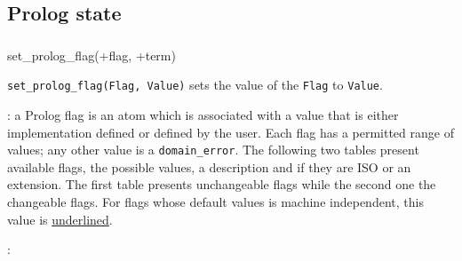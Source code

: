 \subsection{Prolog state}

\subsubsection{\label{set-prolog-flag/2}}

\begin{TemplatesOneCol}
set\_prolog\_flag(+flag, +term)

\end{TemplatesOneCol}

\Description

\texttt{set\_prolog\_flag(Flag, Value)} sets the value
of the  \texttt{Flag} to \texttt{Value}.

: a Prolog flag is an atom
which is associated with a value that is either implementation defined
or defined by the user. Each flag has a permitted range of values; any
other value is a \texttt{domain\_error}. The following two tables
present available flags, the possible values, a description and if
they are ISO or an extension. The first table presents unchangeable
flags while the second one the changeable flags. For flags whose
default values is machine independent, this value is
\underline{underlined}.

:

